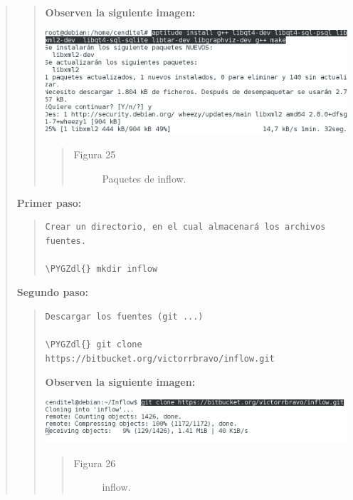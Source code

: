 \documentclass[letterpaper,11pt,spanish]{sphinxmanual}
\def\PYGZdl{\char`\$}
\begin{document}
\begin{quote}
\begin{quote}
\textbf{Observen la siguiente imagen:}

\includegraphics{inflow1.png}
\begin{quote}\begin{description}
\item[{Figura 25}] \leavevmode
Paquetes de inflow.

\end{description}\end{quote}
\end{quote}

\textbf{Primer paso:}
\begin{quote}

\begin{Verbatim}[commandchars=\\\{\}]
 Crear un directorio, en el cual almacenará los archivos fuentes.

\PYGZdl{} mkdir inflow
\end{Verbatim}
\end{quote}

\textbf{Segundo paso:}
\begin{quote}

\begin{Verbatim}[commandchars=\\\{\}]
Descargar los fuentes (git ...)

\PYGZdl{} git clone https://bitbucket.org/victorrbravo/inflow.git
\end{Verbatim}

\textbf{Observen la siguiente imagen:}

\includegraphics{inflow.png}
\begin{quote}\begin{description}
\item[{Figura 26}] \leavevmode
inflow.


\end{description}
\end{quote}
\end{quote}
\end{quote}
\end{document}
